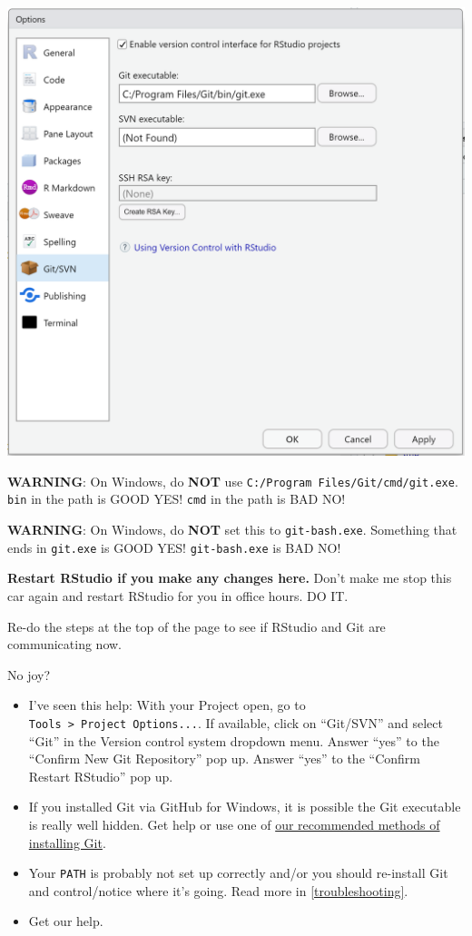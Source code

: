 \documentclass[
]{book}
\begin{document}
\begin{center}\includegraphics[width=1\linewidth]{img/windows-rstudio-git-executable-screenshot} \end{center}

\textbf{WARNING}: On Windows, do \textbf{NOT} use \texttt{C:/Program\ Files/Git/cmd/git.exe}. \texttt{bin} in the path is GOOD YES!
\texttt{cmd} in the path is BAD NO!

\textbf{WARNING}: On Windows, do \textbf{NOT} set this to \texttt{git-bash.exe}.
Something that ends in \texttt{git.exe} is GOOD YES! \texttt{git-bash.exe} is BAD NO!

\textbf{Restart RStudio if you make any changes here.}
Don't make me stop this car again and restart RStudio for you in office hours.
DO IT.

Re-do the steps at the top of the page to see if RStudio and Git are communicating now.

No joy?

\begin{itemize}
\item
  I've seen this help: With your Project open, go to \texttt{Tools\ \textgreater{}\ Project\ Options...}. If available, click on ``Git/SVN'' and select ``Git'' in the Version control system dropdown menu. Answer ``yes'' to the ``Confirm New Git Repository'' pop up. Answer ``yes'' to the ``Confirm Restart RStudio'' pop up.
\item
  If you installed Git via GitHub for Windows, it is possible the Git executable is really well hidden. Get help or use one of \hyperref[install-git]{our recommended methods of installing Git}.
\item
  Your \texttt{PATH} is probably not set up correctly and/or you should re-install Git and control/notice where it's going. Read more in \ref{troubleshooting}.
\item
  Get our help.
\end{itemize}
\end{document}
